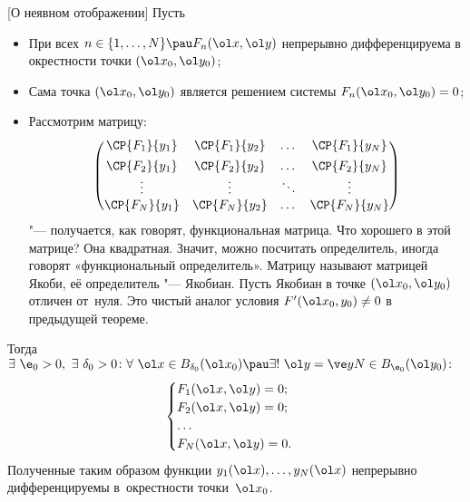 [О неявном отображении] \label{ThoNO} Пусть
\begin{itemize}
\item При всех $n\in\{1,\ldots,N\}\pau F_n(\ol x,\ol y)$ непрерывно дифференцируема в окрестности точки $(\ol x_0,\ol y_0)$;
\item Сама точка $(\ol x_0,\ol y_0)$ является
решением системы $F_n(\ol x_0,\ol y_0)=0$;
\item Рассмотрим матрицу:
\[\begin{pmatrix}
\CP{F_1}{y_1} & \CP{F_1}{y_2} & \dots & \CP{F_1}{y_N} \\[1ex]
\CP{F_2}{y_1} & \CP{F_2}{y_2} & \dots & \CP{F_2}{y_N} \\
\vdots        & \vdots        & \ddots&  \vdots \\
\CP{F_N}{y_1} & \CP{F_N}{y_2} & \dots & \CP{F_N}{y_N} \\
\end{pmatrix}\]
"--- получается, как говорят, функциональная матрица. Что хорошего в этой матрице? Она квадратная. Значит, можно посчитать определитель, иногда говорят «функциональный определитель».
Матрицу называют матрицей Якоби, её определитель "--- Якобиан.
Пусть Якобиан в точке $(\ol x_0,\ol y_0)$ отличен от~нуля. Это чистый аналог условия $F'(\ol x_0,y_0)\ne 0$ в предыдущей теореме.
\end{itemize}
Тогда $\exists\ \e_0>0,\ \exists\ \delta_0>0\colon \forall\ \ol x\in B_{\delta_0}(\ol x_0)\pau\exists!\ \ol y = \ve yN\in B_{\e_0}(\ol y_0)\colon$
\[\begin{cases}
F_1(\ol x,\ol y) = 0;\\
F_2(\ol x,\ol y) = 0;\\
\dots\\
F_N(\ol x,\ol y) = 0.
\end{cases}\]
Полученные таким образом функции $y_1(\ol x),\ldots,y_N(\ol x)$ непрерывно дифференцируемы в~окрестности точки~$\ol x_0$.
